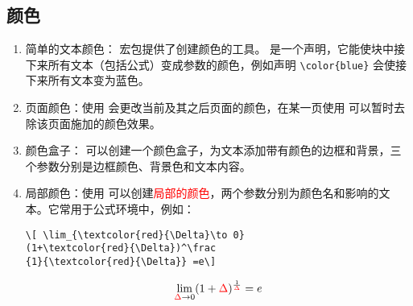 \subsection{颜色}

\begin{enumerate}

\item 简单的文本颜色： 宏包提供了创建颜色的工具。\boxforcmd{\\color{}} 是一个声明，它能使块中接下来所有文本（包括公式）变成参数的颜色，例如声明 \verb|\color{blue}| {\color{blue}会使接下来所有文本变为蓝色。}

\item 页面颜色：使用 \boxforcmd{\\pagecolor{}} 会更改当前及其之后页面的颜色，在某一页使用 \boxforcmd{\\nopagecolor} 可以暂时去除该页面施加的颜色效果。


\item 颜色盒子：\boxforcmd{\\fcolorbox{}{}{}} 可以创建一个颜色盒子，为文本添加带有颜色的边框和背景，三个参数分别是边框颜色、背景色和文本内容。


\item 局部颜色：使用 \boxforcmd{\\textcolor{}{}} 可以创建\textcolor{red}{局部的颜色}，两个参数分别为颜色名和影响的文本。它常用于公式环境中，例如：

\begin{tcolorbox}[sidebyside]
\begin{lstlisting}
\[ \lim_{\textcolor{red}{\Delta}\to 0}
(1+\textcolor{red}{\Delta})^\frac
{1}{\textcolor{red}{\Delta}} =e\]
\end{lstlisting} 

\tcblower

\[
\lim_{\textcolor{red}{\Delta} \to 0}
(1+\textcolor{red}{\Delta})
^\frac{1}{\textcolor{red}{\Delta}} = e
\]
\end{tcolorbox}


\end{enumerate}
